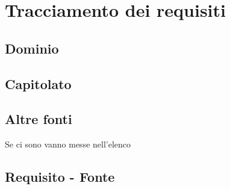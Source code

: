 \section{Tracciamento dei requisiti}
	\subsection{Dominio}
	\subsection{Capitolato}
	\subsection{Altre fonti}
	Se ci sono vanno messe nell'elenco

	\subsection{Requisito - Fonte}
